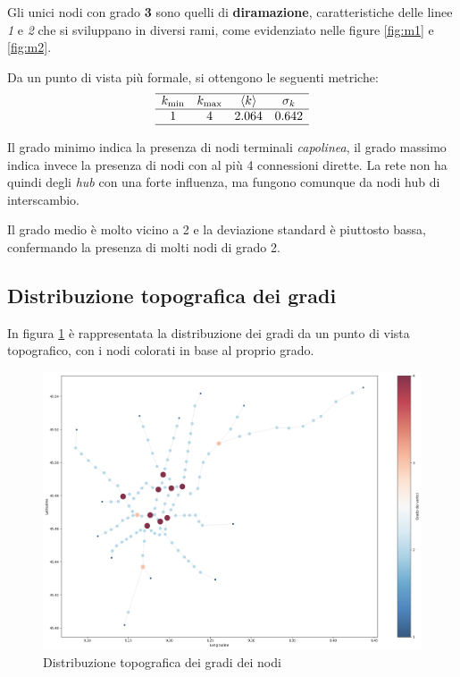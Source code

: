 Gli unici nodi con grado \textbf{3} sono quelli di \textbf{diramazione}, caratteristiche delle linee \textit{1} e \textit{2} che si sviluppano in diversi rami, come evidenziato nelle figure \ref{fig:m1} e \ref{fig:m2}.

Da un punto di vista più formale, si ottengono le seguenti metriche:
\[
\begin{array}{cccc}
\hline
k_{\min} & k_{\max} & \langle k \rangle & \sigma_k \\
\hline
1 & 4 & 2.064 & 0.642 \\
\hline
\end{array}
\]

Il grado minimo indica la presenza di nodi terminali \textit{capolinea}, il grado massimo indica invece la presenza di nodi con al più 4 connessioni dirette. La rete non ha quindi degli \textit{hub} con una forte influenza, ma fungono comunque da nodi hub di interscambio.

Il grado medio è molto vicino a 2 e la deviazione standard è piuttosto bassa, confermando la presenza di molti nodi di grado 2.

\subsection{Distribuzione topografica dei gradi}
In figura \ref{fig: Distribuzione topologica dei gradi dei nodi} è rappresentata la distribuzione dei gradi da un punto di vista topografico, con i nodi colorati in base al proprio grado.

\vspace{1em}
\begin{figure}[h!]
    \centering
    \includegraphics[width=0.8\linewidth]{Immagini//Capitoli//cap3/dist_gradi_mappa.png}
    \caption{Distribuzione topografica dei gradi dei nodi}
    \label{fig: Distribuzione topologica dei gradi dei nodi}
\end{figure}
\vspace{1em}

